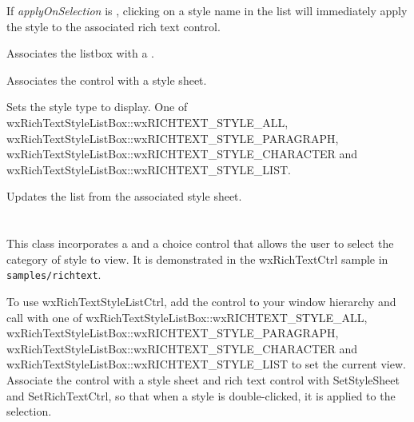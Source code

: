 
If {\it applyOnSelection} is \true, clicking on a style name in the list will immediately
apply the style to the associated rich text control.

\label{wxrichtextstylelistboxsetrichtextctrl}


Associates the listbox with a .

\label{wxrichtextstylelistboxsetstylesheet}


Associates the control with a style sheet.

\label{wxrichtextstylelistboxsetstyletype}


Sets the style type to display. One of wxRichTextStyleListBox::wxRICHTEXT\_STYLE\_ALL, wxRichTextStyleListBox::wxRICHTEXT\_STYLE\_PARAGRAPH,
wxRichTextStyleListBox::wxRICHTEXT\_STYLE\_CHARACTER and wxRichTextStyleListBox::wxRICHTEXT\_STYLE\_LIST.

\label{wxrichtextstylelistboxupdatestyles}


Updates the list from the associated style sheet.


\section{}\label{wxrichtextstylelistctrl}

This class incorporates a  and
a choice control that allows the user to select the category of style to view.
It is demonstrated in the wxRichTextCtrl sample in {\tt samples/richtext}.

To use wxRichTextStyleListCtrl, add the control to your window hierarchy and
call  with
one of wxRichTextStyleListBox::wxRICHTEXT\_STYLE\_ALL, wxRichTextStyleListBox::wxRICHTEXT\_STYLE\_PARAGRAPH,
wxRichTextStyleListBox::wxRICHTEXT\_STYLE\_CHARACTER and wxRichTextStyleListBox::wxRICHTEXT\_STYLE\_LIST to set the current view.
Associate the control with a style sheet and rich text control with SetStyleSheet and SetRichTextCtrl,
so that when a style is double-clicked, it is applied to the selection.

